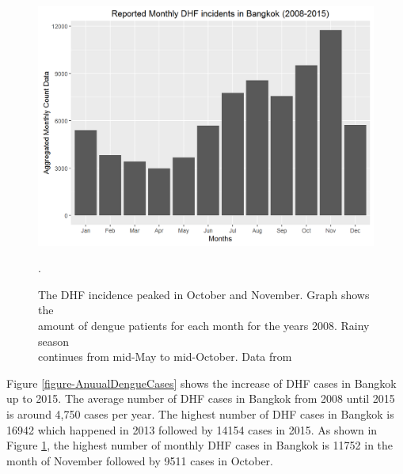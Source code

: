 \documentclass{bmcart}
\begin{document}
\begin{figure}[htbp]
	\begin{center}
		\includegraphics[width= 1.0\textwidth]{4-MonthlyDengueCases}
		\caption{The DHF incidence peaked in October and November. Graph shows the\\ amount of dengue patients for each month for the years 2008. Rainy season\\ continues from mid-May to mid-October. Data from \cite{denguethai2015}}.
		\label{figure-MonthlyDengueCases}
	\end{center}
\end{figure}


Figure \ref{figure-AnuualDengueCases} shows the increase of DHF cases in Bangkok up to 2015. The average number of  DHF cases in Bangkok from 2008 until 2015 is around 4,750 cases per year. The highest number of DHF cases in Bangkok is 16942 which happened in 2013 followed by 14154 cases in 2015. As shown in Figure \ref{figure-MonthlyDengueCases}, the highest number of monthly DHF cases in Bangkok is 11752 in the month of November followed by 9511 cases in October.
\end{document}
